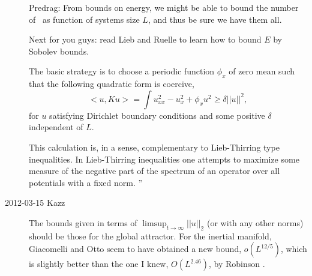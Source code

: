\begin{description}
Predrag: From bounds on energy, we might be able to bound the number of \eqva\ as
function of systems size $L$, and thus be sure we have them all.

Next for you guys: read Lieb and Ruelle to learn how to bound $E$  by
Sobolev bounds.

The basic strategy is to choose a periodic function $\phi_x$ of zero mean
such that the following quadratic form is coercive,
\[
<\!\!u, K u\!\!>= \int u_{xx}^2 - u_x^2 + \phi_x u^2 \ge \delta |\!|u|\!|^2,
\]
for $u$ satisfying Dirichlet boundary conditions and some positive
$\delta$ independent of $L$.

This calculation is, in a sense, complementary to Lieb-Thirring type
inequalities. In Lieb-Thirring inequalities one attempts to maximize some
measure of the negative part of the spectrum of an operator over all
potentials with a fixed norm.
''

\item[2012-03-15 Kazz]
The bounds given in terms of $\limsup_{t \rightarrow \infty} |\!|u|\!|_2$
 (or with any other norms) should be those for the global attractor.
For the inertial manifold,
 Giacomelli and Otto  seem to have obtained a new bound,
 $o(L^{12/5})$, which is slightly better than the one I knew, $O(L^{2.46})$,
 by Robinson .

\end{description}

